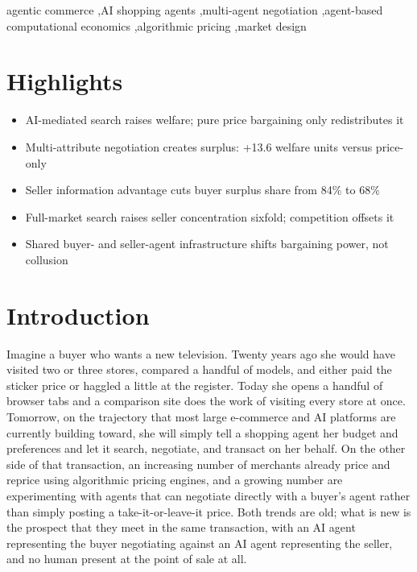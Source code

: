 \documentclass[review]{elsarticle}
\begin{document}
\begin{frontmatter}
\begin{keyword}
agentic commerce \sep AI shopping agents \sep multi-agent negotiation \sep agent-based computational economics \sep algorithmic pricing \sep market design
\end{keyword}

\end{frontmatter}

\section*{Highlights}
\begin{itemize}
\item AI-mediated search raises welfare; pure price bargaining only redistributes it
\item Multi-attribute negotiation creates surplus: +13.6 welfare units versus price-only
\item Seller information advantage cuts buyer surplus share from 84\% to 68\%
\item Full-market search raises seller concentration sixfold; competition offsets it
\item Shared buyer- and seller-agent infrastructure shifts bargaining power, not collusion
\end{itemize}

\linenumbers

\section{Introduction}

Imagine a buyer who wants a new television. Twenty years ago she would have visited two or three stores, compared a handful of models, and either paid the sticker price or haggled a little at the register. Today she opens a handful of browser tabs and a comparison site does the work of visiting every store at once. Tomorrow, on the trajectory that most large e-commerce and AI platforms are currently building toward, she will simply tell a shopping agent her budget and preferences and let it search, negotiate, and transact on her behalf. On the other side of that transaction, an increasing number of merchants already price and reprice using algorithmic pricing engines, and a growing number are experimenting with agents that can negotiate directly with a buyer's agent rather than simply posting a take-it-or-leave-it price. Both trends are old; what is new is the prospect that they meet in the same transaction, with an AI agent representing the buyer negotiating against an AI agent representing the seller, and no human present at the point of sale at all.
\end{document}
